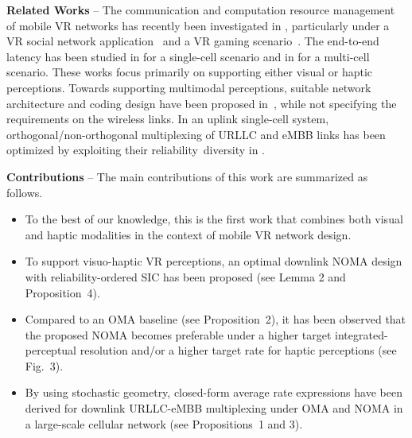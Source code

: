 \documentclass[conference]{IEEEtran}
\begin{document}
\textbf{Related Works} -- 
The communication and computation resource management of mobile VR networks has recently been investigated in \cite{EjderVR:17,OsvaldoAR:17,ChenSaad:17,ParkWCL:18,Elbamby:18}, particularly under a VR social network application~\cite{ParkWCL:18} and a VR gaming scenario~\cite{Elbamby:18}. The end-to-end latency has been studied in \cite{OsvaldoAR:17} for a single-cell scenario and in \cite{ChenSaad:17,ParkWCL:18} for a multi-cell scenario. These works focus primarily on supporting either visual or haptic perceptions. Towards supporting multimodal perceptions, suitable network architecture and coding design have been proposed in~\cite{Zhang:18,Steinbach:12}, while not specifying the requirements on the wireless links. In an uplink single-cell system, orthogonal/non-orthogonal multiplexing of URLLC and eMBB links has been optimized by exploiting their reliability~diversity in \cite{Petar5G:18}.




\textbf{Contributions} --
The main contributions of this work are summarized as follows.
\begin{itemize}
\item To the best of our knowledge, this is the first work that combines both visual and haptic modalities in the context of mobile VR network design.

\item To support visuo-haptic VR perceptions, an optimal downlink NOMA design with reliability-ordered SIC has been proposed (see {Lemma 2} and {Proposition~4}).

\item Compared to an OMA baseline (see {Proposition~2}), it has been observed that the proposed NOMA becomes preferable under a higher target integrated-perceptual resolution and/or a higher target rate for haptic perceptions (see {Fig.~3}).

\item By using stochastic geometry, closed-form average rate expressions have been derived for downlink URLLC-eMBB multiplexing under OMA and NOMA in a large-scale cellular network (see {Propositions}~{1} and {3}).

\end{itemize}
\end{document}
